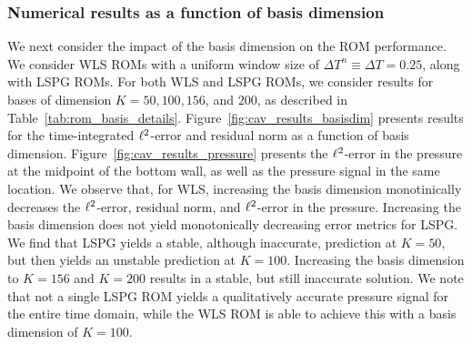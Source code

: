 \subsubsection{Numerical results as a function of basis dimension}
We next consider the impact of the basis dimension on the ROM performance. We consider WLS ROMs with a uniform window
size of $\Delta T^n \equiv \Delta T = 0.25$, along with LSPG ROMs. For both WLS and LSPG ROMs, we consider results for bases of 
dimension $K=50,100,156$, and $200$, as described in Table~\ref{tab:rom_basis_details}. Figure~\ref{fig:cav_results_basisdim}
presents results for the time-integrated $\ell^2$-error and residual norm as a function of basis dimension. Figure~\ref{fig:cav_results_pressure} presents the $\ell^2$-error in the pressure at the midpoint of the bottom wall, as well as the pressure signal in the same location. We observe that, for WLS, increasing the basis dimension monotinically decreases the $\ell^2$-error, residual norm, and $\ell^2$-error in the pressure. Increasing the basis dimension does not yield monotonically decreasing error metrics for LSPG. We find that LSPG yields a stable, although inaccurate, prediction at $K=50$, but then yields an unstable prediction at $K=100$. Increasing the basis dimension to $K=156$ and $K=200$ results in a stable, but still inaccurate solution. We note that not a single LSPG ROM yields a qualitatively accurate pressure signal for the entire time domain, while the WLS ROM is able to achieve this with a basis dimension of $K=100$. 
